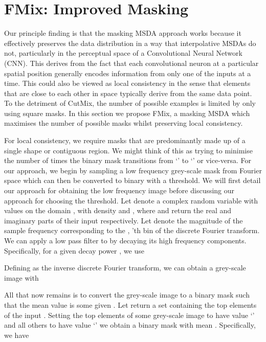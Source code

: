 \documentclass[journal]{IEEEtran}
\newcommand{\fmix}{FMix\xspace}
\newcommand{\cutmix}{CutMix\xspace}
\begin{document}
\section{\fmix: Improved Masking}

Our principle finding is that the masking MSDA approach works because it effectively preserves the data distribution in a way that interpolative MSDAs do not,
particularly in the perceptual space of a Convolutional Neural Network (CNN).
This derives from the fact that each convolutional neuron at a particular spatial position generally encodes information from only one of the inputs at a time. This could also be viewed as local consistency in the sense that elements that are close to each other in space typically derive from the same data point.
To the detriment of \cutmix, the number of possible examples is limited by only using square masks.
In this section we propose \fmix, a masking MSDA which maximises the number of possible masks whilst preserving local consistency.

For local consistency, we require masks that are predominantly made up of a single shape or contiguous region. We might think of this as trying to minimise the number of times the binary mask transitions from `' to `' or vice-versa. For our approach, we begin by sampling a low frequency grey-scale mask from Fourier space which can then be converted to binary with a threshold.
We will first detail our approach for obtaining the low frequency image before discussing our approach for choosing the threshold.
Let  denote a complex random variable with values on the domain , with density
 and , where  and  return the real and imaginary parts of their input respectively. Let  denote the magnitude of the sample frequency corresponding to the , 'th bin of the  discrete Fourier transform.
We can apply a low pass filter to  by decaying its high frequency components. Specifically, for a given decay power , we use

Defining  as the inverse discrete Fourier transform, we can obtain a grey-scale image with

All that now remains is to convert the grey-scale image to a binary mask such that the mean value is some given . Let  return a set containing the top  elements of the input . Setting the top  elements of some grey-scale image  to have value `' and all others to have value `' we obtain a binary mask with mean . Specifically, we have
\end{document}
